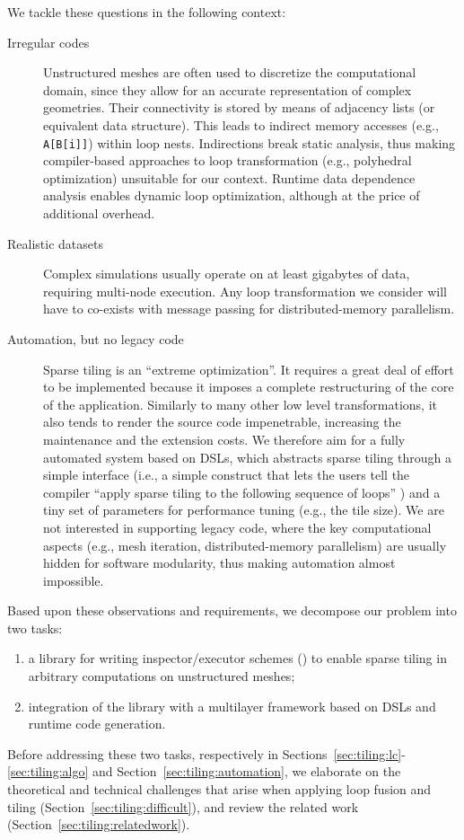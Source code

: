 We tackle these questions in the following context:
\begin{description}
\item[Irregular codes] Unstructured meshes are often used to discretize the computational domain, since they allow for an accurate representation of complex geometries. Their connectivity is stored by means of adjacency lists (or equivalent data structure). This leads to indirect memory accesses (e.g., \texttt{A[B[i]]}) within loop nests. Indirections break static analysis, thus making compiler-based approaches to loop transformation (e.g., polyhedral optimization) unsuitable for our context. Runtime data dependence analysis enables dynamic loop optimization, although at the price of additional overhead.
\item[Realistic datasets] Complex simulations usually operate on at least gigabytes of data, requiring multi-node execution. Any loop transformation we consider will have to co-exists with message passing for distributed-memory parallelism.
\item[Automation, but no legacy code] Sparse tiling is an ``extreme optimization''. It requires a great deal of effort to be implemented because it imposes a complete restructuring of the core of the application. Similarly to many other low level transformations, it also tends to render the source code impenetrable, increasing the maintenance and the extension costs. We therefore aim for a fully automated system based on DSLs, which abstracts sparse tiling through a simple interface (i.e., a simple construct that lets the users tell the compiler ``apply sparse tiling to the following sequence of loops'' ) and a tiny set of parameters for performance tuning (e.g., the tile size). We are not interested in supporting legacy code, where the key computational aspects (e.g., mesh iteration, distributed-memory parallelism) are usually hidden for software modularity, thus making automation almost impossible.
\end{description}

Based upon these observations and requirements, we decompose our problem into two tasks:
\begin{enumerate}
\item a library for writing inspector/executor schemes (\cite{ST-Saltz91}) to enable sparse tiling in arbitrary computations on unstructured meshes;
\item integration of the library with a multilayer framework based on DSLs and runtime code generation.
\end{enumerate}
Before addressing these two tasks, respectively in Sections~\ref{sec:tiling:lc}-\ref{sec:tiling:algo} and Section~\ref{sec:tiling:automation}, we elaborate on the theoretical and technical challenges that arise when applying loop fusion and tiling (Section~\ref{sec:tiling:difficult}), and review the related work (Section~\ref{sec:tiling:relatedwork}).  

